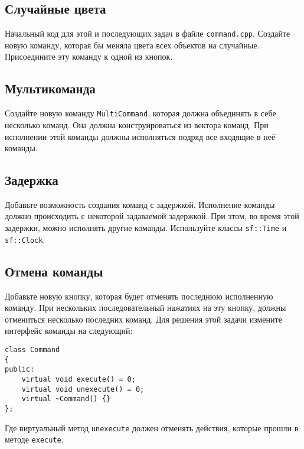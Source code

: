 \documentclass{article}
\begin{document}
\subsection{Случайные цвета}
Начальный код для этой и последующих задач в файле \texttt{command.cpp}. Создайте новую команду, которая бы меняла цвета всех объектов на случайные. Присоедините эту команду к одной из кнопок.

        
\subsection{Мультикоманда}
Создайте новую команду \texttt{MultiCommand}, которая должна объединять в себе несколько команд. Она должна конструироваться из вектора команд. При исполнении этой команды должны исполняться подряд все входящие в неё команды.


\subsection{Задержка}
Добавьте возможность создания команд с задержкой. Исполнение команды должно происходить с некоторой задаваемой задержкой. При этом, во время этой задержки, можно исполнять другие команды. Используйте классы \texttt{sf::Time} и \texttt{sf::Clock}.


\subsection{Отмена команды}
Добавьте новую кнопку, которая будет отменять последнюю исполненную команду.
При нескольких последовательный нажатиях на эту кнопку, должны отмениться несколько последних команд.
Для решения этой задачи измените интерфейс команды на следующий:
\begin{lstlisting}
class Command
{
public:
    virtual void execute() = 0;
    virtual void unexecute() = 0;
    virtual ~Command() {}
};
\end{lstlisting}
Где виртуальный метод \texttt{unexecute} должен отменять действия, которые прошли в методе \texttt{execute}.
\end{document}
